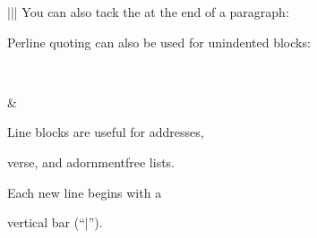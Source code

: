 \documentclass[letterpaper,10pt,english]{sphinxmanual}
\begin{document}
\begin{savenotes}
\begin{tabular}[t]{|*{2}{|}}
You can also tack the \sphinxcode{\sphinxupquote{::}} at the end of a
paragraph:

\begin{sphinxVerbatimintable}[commandchars=\\\{\}]
\end{sphinxVerbatimintable}

Per\sphinxhyphen{}line quoting can also be used for
unindented blocks:

\begin{sphinxVerbatimintable}[commandchars=\\\{\}]
      
    
\end{sphinxVerbatimintable}
\\
\hline
\begin{sphinxVerbatimintable}[commandchars=\\\{\}]
      
    
      
   
         
      
    
       
        
\end{sphinxVerbatimintable}
&
\begin{DUlineblock}{0em}
\item[] Line blocks are useful for addresses,
\item[] verse, and adornment\sphinxhyphen{}free lists.
\item[] 
\item[] Each new line begins with a
\item[] vertical bar (“|”).
\item[]

\end{DUlineblock}
\end{tabular}
\end{savenotes}
\end{document}
